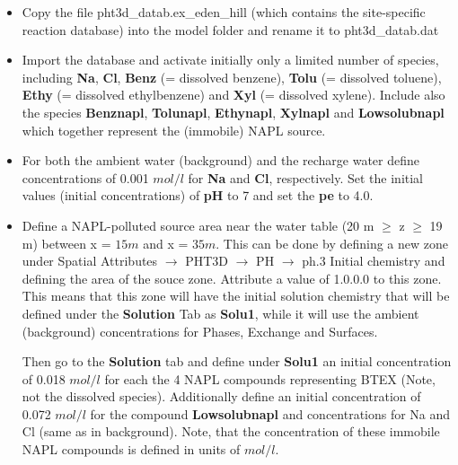 \begin{itemize}

\item Copy the file {\color{blue} pht3d\_datab.ex\_eden\_hill} (which contains the site-specific 
reaction database) into the model folder and rename it to {\color{blue} pht3d\_datab.dat}

\item Import the database and activate initially 
only a limited number of species, including {\color{red} \textbf{Na}}, 
{\color{red} \textbf{Cl}}, {\color{red} \textbf{Benz}} (= dissolved benzene), 
{\color{red} \textbf{Tolu}} (= dissolved toluene), {\color{red} \textbf{Ethy}} (= dissolved ethylbenzene) and {\color{red} \textbf{Xyl}} (= dissolved xylene).
Include also the species {\color{red} \textbf{Benznapl}}, {\color{red} \textbf{Tolunapl}}, {\color{red} \textbf{Ethynapl}}, {\color{red} \textbf{Xylnapl}} and {\color{red} \textbf{Lowsolubnapl}} 
which together represent the (immobile) NAPL source.  

\item For both the ambient water (background) and the recharge water define concentrations 
of 0.001 $mol/l$ for {\color{red} \textbf{Na}} and {\color{red} \textbf{Cl}}, respectively. 
Set the initial values (initial concentrations) of {\color{red} \textbf{pH}} to 7 
and set the {\color{red} \textbf{pe}} to 4.0. 

\item Define a NAPL-polluted source area near the water table (20 m $\geq$ z $\geq$ 19 m) 
between x = $15 m$ and x = $35 m$. 
This can be done by defining a new zone under 
{\color{blue}Spatial Attributes} $\rightarrow$ {\color{blue}PHT3D} $\rightarrow$ {\color{blue}PH} $\rightarrow$ {\color{blue}ph.3 Initial chemistry} and defining the area of the souce zone.
Attribute a value of 1.0.0.0 to this zone.
This means that this zone will have the initial solution chemistry that will be defined
under the {\color{blue} \textbf{Solution}} Tab as {\color{red} \textbf{Solu1}}, while it will use the ambient (background) concentrations
for Phases, Exchange and Surfaces. 

Then go to the {\color{blue} \textbf{Solution}} tab and define under {\color{red} \textbf{Solu1}} 
an initial concentration of 0.018 $mol/l$
 for each the 4 NAPL compounds representing BTEX (Note, not the dissolved species). 
Additionally define an initial concentration
of 0.072 $mol/l$ for the compound {\color{red} \textbf{Lowsolubnapl}} 
and concentrations for Na and Cl (same as in background).
Note, that the concentration of these immobile NAPL compounds
is defined in units of $mol/l$.


\end{itemize}
